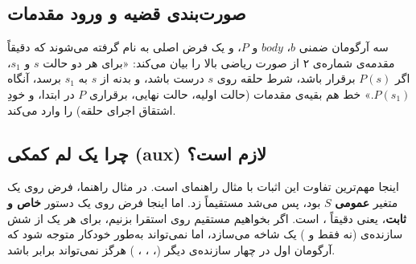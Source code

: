 \documentclass[12pt]{report}
\begin{document}
	\subsection{صورت‌بندی قضیه و ورود مقدمات}
	سه آرگومان ضمنی $b$، $body$ و $P$، و یک فرض اصلی به نام  گرفته می‌شوند که دقیقاً مقدمه‌ی شماره‌ی ۲ از صورت ریاضی بالا را بیان می‌کند: «برای هر دو حالت $s$ و $s_1$، اگر $P(s)$ برقرار باشد، شرط حلقه روی $s$ درست باشد، و بدنه از $s$ به $s_1$ برسد، آنگاه $P(s_1)$.» خط  هم بقیه‌ی مقدمات (حالت اولیه، حالت نهایی، برقراری $P$ در ابتدا، و خودِ اشتقاق اجرای حلقه) را وارد می‌کند.
	
	\subsection{چرا یک لم کمکی (aux) لازم است؟}
	اینجا مهم‌ترین تفاوت این اثبات با مثال راهنمای  است. در مثال راهنما، فرض  روی یک متغیر \textbf{عمومی} $S$ بود، پس می‌شد مستقیماً  زد. اما اینجا فرض  روی یک دستور \textbf{خاص و ثابت}، یعنی دقیقاً ، است. اگر بخواهیم مستقیم روی  استقرا بزنیم،  برای هر یک از شش سازنده‌ی  (نه فقط  و ) یک شاخه می‌سازد، اما نمی‌تواند به‌طور خودکار متوجه شود که آرگومان اول در چهار سازنده‌ی دیگر (، ، ، ) هرگز نمی‌تواند برابر  باشد.
	
\end{document}
